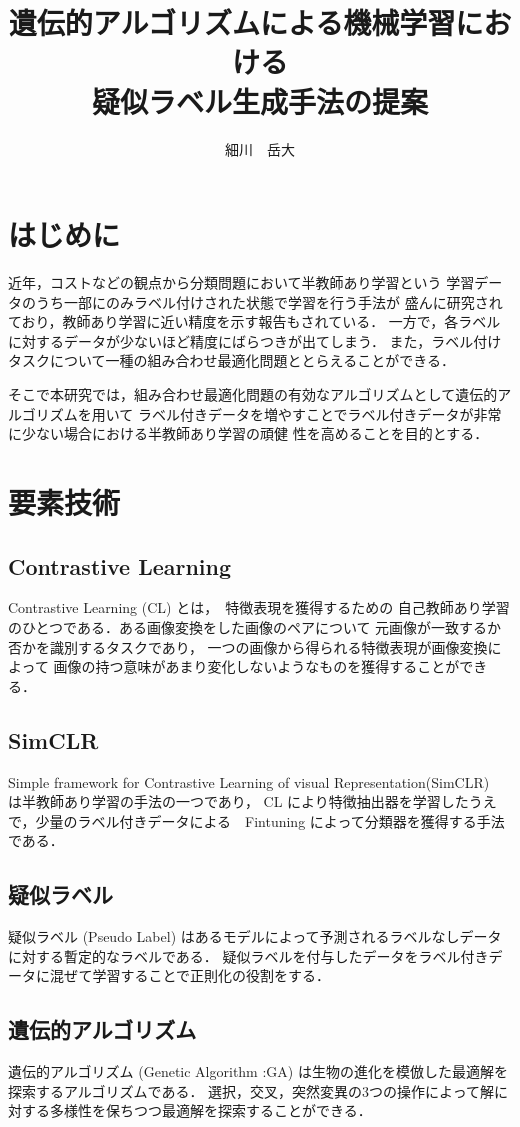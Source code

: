 \documentclass[a4paper,twoside,twocolumn,10pt]{jarticle}     %
\title{遺伝的アルゴリズムによる機械学習における\\疑似ラベル生成手法の提案}
\author{細川　岳大}
\begin{document}
\maketitle
\small
\section{はじめに}
近年，コストなどの観点から分類問題において半教師あり学習という
学習データのうち一部にのみラベル付けされた状態で学習を行う手法が
盛んに研究されており，教師あり学習に近い精度を示す報告もされている．
一方で，各ラベルに対するデータが少ないほど精度にばらつきが出てしまう．
また，ラベル付けタスクについて一種の組み合わせ最適化問題ととらえることができる．

そこで本研究では，組み合わせ最適化問題の有効なアルゴリズムとして遺伝的アルゴリズムを用いて
ラベル付きデータを増やすことでラベル付きデータが非常に少ない場合における半教師あり学習の頑健
性を高めることを目的とする．
\section{要素技術}
\subsection{Contrastive Learning}
Contrastive Learning (CL) とは，　特徴表現を獲得するための
自己教師あり学習のひとつである．ある画像変換をした画像のペアについて
元画像が一致するか否かを識別するタスクであり，
一つの画像から得られる特徴表現が画像変換によって
画像の持つ意味があまり変化しないようなものを獲得することができる．
\subsection{SimCLR}
Simple framework for Contrastive Learning of visual Representation(SimCLR)\cite{chen2020simple}　は半教師あり学習の手法の一つであり， CL により特徴抽出器を学習したうえで，少量のラベル付きデータによる　Fintuning によって分類器を獲得する手法である．
\subsection{疑似ラベル}
疑似ラベル (Pseudo Label) はあるモデルによって予測されるラベルなしデータに対する暫定的なラベルである．
疑似ラベルを付与したデータをラベル付きデータに混ぜて学習することで正則化の役割をする．
\subsection{遺伝的アルゴリズム}
遺伝的アルゴリズム (Genetic Algorithm :GA) は生物の進化を模倣した最適解を探索するアルゴリズムである．
選択，交叉，突然変異の3つの操作によって解に対する多様性を保ちつつ最適解を探索することができる．
\end{document}
